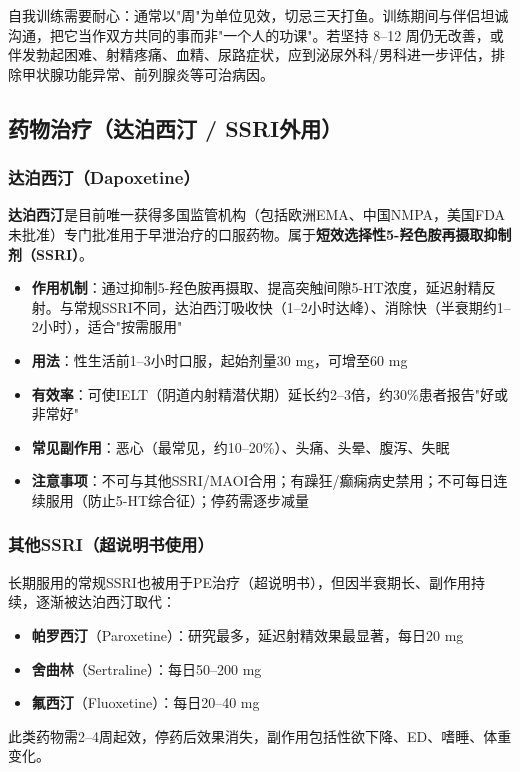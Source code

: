 \begin{tcolorbox}[colback=pink!5!white,colframe=red!50!black,title=贴心小叮咛]
自我训练需要耐心：通常以"周"为单位见效，切忌三天打鱼。训练期间与伴侣坦诚沟通，把它当作双方共同的事而非"一个人的功课"。若坚持 8--12 周仍无改善，或伴发勃起困难、射精疼痛、血精、尿路症状，应到泌尿外科/男科进一步评估，排除甲状腺功能异常、前列腺炎等可治病因。
\end{tcolorbox}

\subsection{药物治疗（达泊西汀 / SSRI外用）}

\subsubsection{达泊西汀（Dapoxetine）}

\textbf{达泊西汀}是目前唯一获得多国监管机构（包括欧洲EMA、中国NMPA，美国FDA未批准）专门批准用于早泄治疗的口服药物。属于\textbf{短效选择性5-羟色胺再摄取抑制剂（SSRI）}。

\begin{itemize}[leftmargin=2cm]
	\item \textbf{作用机制}：通过抑制5-羟色胺再摄取、提高突触间隙5-HT浓度，延迟射精反射。与常规SSRI不同，达泊西汀吸收快（1--2小时达峰）、消除快（半衰期约1--2小时），适合"按需服用"
	\item \textbf{用法}：性生活前1--3小时口服，起始剂量30 mg，可增至60 mg
	\item \textbf{有效率}：可使IELT（阴道内射精潜伏期）延长约2--3倍，约30\%患者报告"好或非常好"
	\item \textbf{常见副作用}：恶心（最常见，约10--20\%）、头痛、头晕、腹泻、失眠
	\item \textbf{注意事项}：不可与其他SSRI/MAOI合用；有躁狂/癫痫病史禁用；不可每日连续服用（防止5-HT综合征）；停药需逐步减量
\end{itemize}

\subsubsection{其他SSRI（超说明书使用）}

长期服用的常规SSRI也被用于PE治疗（超说明书），但因半衰期长、副作用持续，逐渐被达泊西汀取代：
\begin{itemize}[leftmargin=2cm]
	\item \textbf{帕罗西汀}（Paroxetine）：研究最多，延迟射精效果最显著，每日20 mg
	\item \textbf{舍曲林}（Sertraline）：每日50--200 mg
	\item \textbf{氟西汀}（Fluoxetine）：每日20--40 mg
\end{itemize}
此类药物需2--4周起效，停药后效果消失，副作用包括性欲下降、ED、嗜睡、体重变化。

